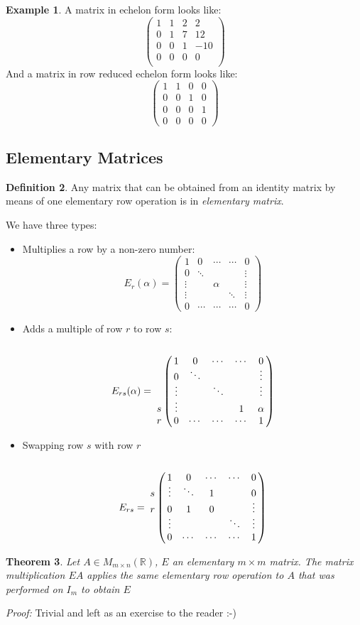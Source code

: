 \documentclass{report}
\newtheorem{theorem}{Theorem}[subsection]
\theoremstyle{remark}
\theoremstyle{definition}
\newtheorem{definition}[theorem]{Definition}
\theoremstyle{definition}
\newtheorem{example}[theorem]{Example}
\theoremstyle{theorem}
\begin{document}
\begin{example}
A matrix in echelon form looks like:
\[\left(\begin{array}{ccc|c}
1&1&2&2\\
0&1&7&12\\
0&0&1&-10\\
0&0&0&0\\
\end{array} \right) \]
And a matrix in row reduced echelon form looks like:\\
\[ \left( \begin{array}{ccc|c}
1&1&0&0\\
0&0&1&0\\
0&0&0&1\\
0&0&0&0
\end{array} \right) \]
\end{example}
\subsection{Elementary Matrices}
\begin{definition}
Any matrix that can be obtained from an identity matrix by means of one elementary row operation is in \emph{elementary matrix}.
\end{definition}
We have three types: 
\begin{itemize}
\item Multiplies a row by a non-zero number:
\[ E_r(\alpha) = \begin{pmatrix}
1&0&\cdots&\cdots&0\\
0&\ddots&&&\vdots\\
\vdots&&\alpha&&\vdots\\
\vdots&&&\ddots&\vdots\\
0&\cdots&\cdots&\cdots&0
\end{pmatrix} \]
\item Adds a multiple of row $r$ to row $s$:
\[ E_{rs}(\alpha) = \bordermatrix{
&&&&&\cr
&1&0&\cdots&\cdots&0\cr
&0&\ddots&&&\vdots\cr
&\vdots&&\ddots&&\vdots\cr
s&\vdots&&&1&\alpha\cr
r&0&\cdots&\cdots&\cdots&1\cr} 
\]
\item Swapping row $s$ with row $r$
\[
E_{rs} = \bordermatrix{
&&&&&\cr
&1&0&\cdots&\cdots&0\cr
s&\vdots&\ddots&1&&0\cr
r&0&1&0&&\vdots\cr
&\vdots&&&\ddots&\vdots\cr
&0&\cdots&\cdots&\cdots&1\cr
}
\]
\end{itemize}
\begin{theorem}
Let $A \in M_{m \times n}(\mathbb{R})$, $E$ an elementary $m \times m$ matrix. The matrix multiplication $EA$ applies the same elementary row operation to $A$ that was performed on $I_m$ to obtain $E$
\end{theorem}
\emph{Proof:} Trivial and left as an exercise to the reader :-)
\end{document}
